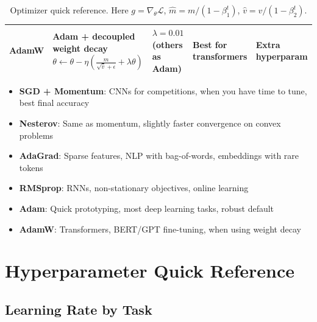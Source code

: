\documentclass[../main.tex]{subfiles}
\begin{document}
\begin{table}[htbp]
\begin{tabularx}{\textwidth}{@{}l>{\raggedright\arraybackslash}p{2.8cm}>{\raggedright\arraybackslash}p{1.8cm}>{\raggedright\arraybackslash}p{2.2cm}>{\raggedright\arraybackslash}p{2.2cm}@{}}
\textbf{AdamW} &
Adam + decoupled weight decay \newline
$\theta \leftarrow \theta - \eta\left(\frac{\hat{m}}{\sqrt{\hat{v}} + \epsilon} + \lambda\theta\right)$ &
$\lambda = 0.01$ \newline (others as Adam) &
Best for transformers &
Extra hyperparam \\

\bottomrule
\end{tabularx}
\caption{Optimizer quick reference. Here $g = \nabla_\theta \mathcal{L}$, $\hat{m} = m/(1-\beta_1^t)$, $\hat{v} = v/(1-\beta_2^t)$.}
\label{tab:optimizer-quick-reference}
\end{table}

\begin{tcolorbox}[colback=gray!5, colframe=gray!50, title={\textbf{When to Use Each Optimizer}}, fonttitle=\bfseries]
\begin{itemize}[leftmargin=*, itemsep=2pt]
    \item \textbf{SGD + Momentum}: CNNs for competitions, when you have time to tune, best final accuracy
    \item \textbf{Nesterov}: Same as momentum, slightly faster convergence on convex problems
    \item \textbf{AdaGrad}: Sparse features, NLP with bag-of-words, embeddings with rare tokens
    \item \textbf{RMSprop}: RNNs, non-stationary objectives, online learning
    \item \textbf{Adam}: Quick prototyping, most deep learning tasks, robust default
    \item \textbf{AdamW}: Transformers, BERT/GPT fine-tuning, when using weight decay
\end{itemize}
\end{tcolorbox}

\section{Hyperparameter Quick Reference}\label{sec:cheat-hyperparams}

\subsection{Learning Rate by Task}
\end{document}
